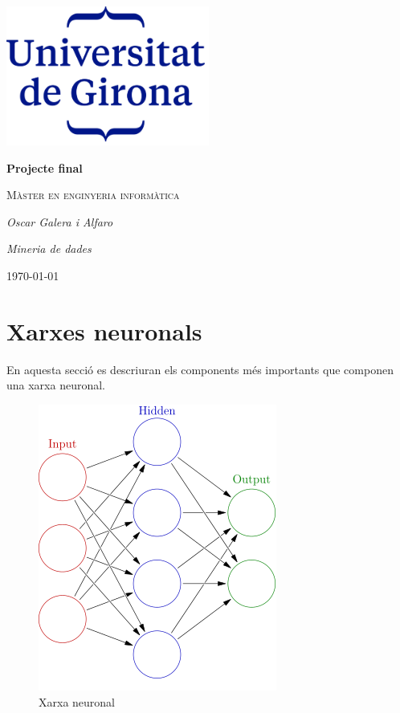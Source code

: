 \documentclass[12pt]{article}
\begin{document}
\begin{titlepage}
		\centering
		\includegraphics[width=0.5\textwidth]{imatges/logo.png}\par\vspace{1cm}
		{\huge\bfseries Projecte final\par}
		\vspace{1cm}
		{\scshape\Large Màster en enginyeria informàtica\par}
		\vspace{1.5cm}
		{\Large\itshape Oscar Galera i Alfaro\par}
		\vspace{1cm}
		{\Large\itshape Mineria de dades\par}
		\vspace{2cm}
		\vfill
		\vfill
		{\large \today\par}
\end{titlepage}
\clearpage
\tableofcontents
\clearpage
\listoffigures


\clearpage
\section{Xarxes neuronals}
En aquesta secció es descriuran els components més importants que componen una xarxa neuronal.
\begin{figure}[h!]
	\centering
	\includegraphics[scale=.5]{imatges/xnn.png}
	\caption{Xarxa neuronal}
\end{figure}
\end{document}
